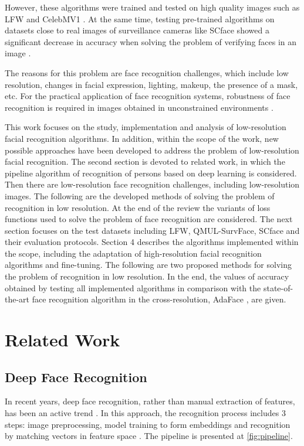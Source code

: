 \documentclass[11pt,a4paper]{article}
\begin{document}
However, these algorithms were trained and tested on high quality images such as LFW \cite{lfw} and CelebMV1 \cite{celeb}. At the same time, testing pre-trained algorithms on datasets close to real images of surveillance cameras like SCface \cite{scface} showed a significant decrease in accuracy when solving the problem of verifying faces in an image \cite{3}.

The reasons for this problem are face recognition challenges, which include low resolution, changes in facial expression, lighting, makeup, the presence of a mask, etc. For the practical application of face recognition systems, robustness of face recognition is required in images obtained in unconstrained environments \cite{deepFaceRecognition}.

This work focuses on the study, implementation and analysis of low-resolution facial recognition algorithms. In addition, within the scope of the work, new possible approaches have been developed to address the problem of low-resolution facial recognition. The second section is devoted to related work, in which the pipeline algorithm of recognition of persons based on deep learning is considered. Then there are low-resolution face recognition challenges, including low-resolution images. The following are the developed methods of solving the problem of recognition in low resolution. At the end of the review the variants of  loss functions used to solve the problem of face recognition are considered. The next section focuses on the test datasets including  LFW\cite{lfw}, QMUL-SurvFace\cite{qmul}, SCface \cite{scface}  and their evaluation protocols. Section 4 describes the algorithms implemented within the scope, including the adaptation of high-resolution facial recognition algorithms and fine-tuning. The following are two proposed methods for solving the problem of recognition in low resolution. In the end, the values of accuracy obtained by testing all implemented algorithms in comparison with the state-of-the-art face recognition algorithm in the cross-resolution, AdaFace \cite{adaface}, are given. 

\section{Related Work}
\subsection{Deep Face Recognition}
In recent years, deep face recognition, rather than manual extraction of features, has been an active trend \cite{deepFaceRecognition}. In this approach, the recognition process includes 3 steps: image preprocessing, model training to form embeddings and recognition by matching vectors in feature space \cite{deepFaceRecognition}. The pipeline is presented at \ref{fig:pipeline}.
\end{document}
